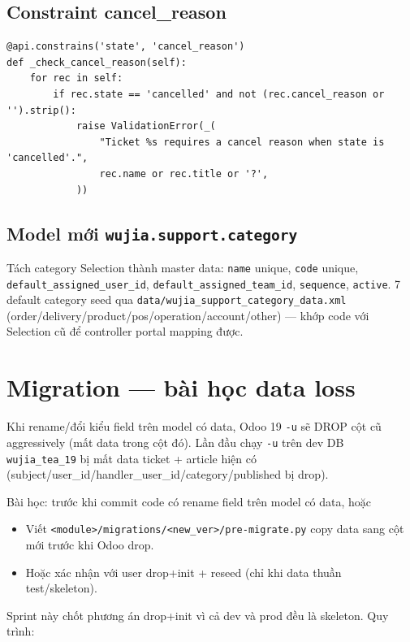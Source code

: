 \subsection{Constraint cancel\_reason}

\begin{lstlisting}[style=python]
@api.constrains('state', 'cancel_reason')
def _check_cancel_reason(self):
    for rec in self:
        if rec.state == 'cancelled' and not (rec.cancel_reason or '').strip():
            raise ValidationError(_(
                "Ticket %s requires a cancel reason when state is 'cancelled'.",
                rec.name or rec.title or '?',
            ))
\end{lstlisting}

\subsection{Model mới \texttt{wujia.support.category}}

Tách category Selection thành master data: \texttt{name} unique, \texttt{code} unique, \texttt{default\_assigned\_user\_id}, \texttt{default\_assigned\_team\_id}, \texttt{sequence}, \texttt{active}. 7 default category seed qua \texttt{data/wujia\_support\_category\_data.xml} (order/delivery/product/pos/operation/account/other) --- khớp code với Selection cũ để controller portal mapping được.

\section{Migration --- bài học data loss}

Khi rename/đổi kiểu field trên model có data, Odoo 19 \texttt{-u} sẽ DROP cột cũ aggressively (mất data trong cột đó). Lần đầu chạy \texttt{-u} trên dev DB \texttt{wujia\_tea\_19} bị mất data ticket + article hiện có (subject/user\_id/handler\_user\_id/category/published bị drop).

Bài học: trước khi commit code có rename field trên model có data, hoặc

\begin{itemize}[leftmargin=*]
    \item Viết \texttt{<module>/migrations/<new\_ver>/pre-migrate.py} copy data sang cột mới trước khi Odoo drop.
    \item Hoặc xác nhận với user drop+init + reseed (chỉ khi data thuần test/skeleton).
\end{itemize}

Sprint này chốt phương án drop+init vì cả dev và prod đều là skeleton. Quy trình:

